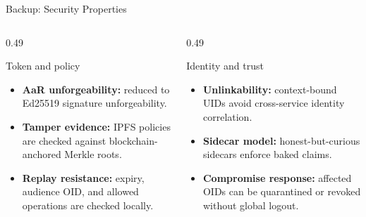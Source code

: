\documentclass[aspectratio=169,11pt]{beamer}
\newcommand{\tightitems}{%
  \setlength{\topsep}{2pt}%
  \setlength{\itemsep}{4pt}%
  \setlength{\parsep}{0pt}%
}
\begin{document}
{\begin{frame}[noframenumbering]{Backup: Security Properties}
\vspace{2pt}
\begin{columns}[T,onlytextwidth]
\begin{column}{0.49\textwidth}
\begin{callout}{Token and policy}
\begin{itemize}\tightitems
\item \textbf{AaR unforgeability:} reduced to Ed25519 signature unforgeability.
\item \textbf{Tamper evidence:} IPFS policies are checked against blockchain-anchored Merkle roots.
\item \textbf{Replay resistance:} expiry, audience OID, and allowed operations are checked locally.
\end{itemize}
\end{callout}
\end{column}
\begin{column}{0.49\textwidth}
\begin{callout}{Identity and trust}
\begin{itemize}\tightitems
\item \textbf{Unlinkability:} context-bound UIDs avoid cross-service identity correlation.
\item \textbf{Sidecar model:} honest-but-curious sidecars enforce baked claims.
\item \textbf{Compromise response:} affected OIDs can be quarantined or revoked without global logout.
\end{itemize}
\end{callout}
\end{column}
\end{columns}
\end{frame}

}
\end{document}
